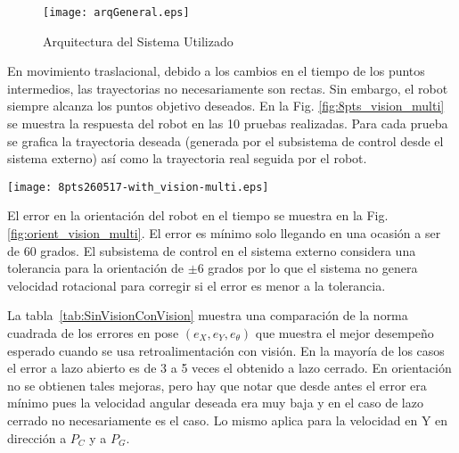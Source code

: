 \begin{figure}
	\centering
		\texttt{[image: arqGeneral.eps]}
	\caption{Arquitectura del Sistema Utilizado}
	\label{fig:arq_gral}
\end{figure}


En movimiento traslacional, debido a los cambios en el tiempo de los puntos intermedios, las trayectorias no necesariamente son rectas. Sin embargo, el robot siempre alcanza los puntos objetivo deseados. En la Fig. \ref{fig:8pts_vision_multi} se muestra la respuesta del robot en las 10 pruebas realizadas. Para cada prueba se grafica la trayectoria deseada (generada por el subsistema de control desde el sistema externo) así como la trayectoria real seguida por el robot.

\begin{sidewaysfigure}
	\centering
		\texttt{[image: 8pts260517-with\_vision-multi.eps]}
	\caption{Movimiento del Robot con Retroalimentación de Visión y Trayectorias Dinámicas}
	\label{fig:8pts_vision_multi}
\end{sidewaysfigure}

El error en la orientación del robot en el tiempo se muestra en la Fig. \ref{fig:orient_vision_multi}. El error es mínimo solo llegando en una ocasión a ser de 60 grados. 
El subsistema de control en el sistema externo considera una tolerancia para la orientación de $\pm 6$ grados por lo que el sistema no genera velocidad rotacional para corregir si el error es menor a la tolerancia.

La tabla~\ref{tab:SinVisionConVision} muestra una comparación de la norma cuadrada de los errores en pose $(e_X,e_Y,e_\theta)$ que muestra el mejor desempeño esperado cuando se usa retroalimentación con visión. En la mayoría de los casos el error a lazo abierto es de 3 a 5 veces el obtenido a lazo cerrado. En orientación no se obtienen tales mejoras, pero hay que notar que desde antes el error era mínimo pues la velocidad angular deseada era muy baja y en el caso de lazo cerrado no necesariamente es el caso. Lo mismo aplica para la velocidad en Y en dirección a $P_C$ y a $P_G$.

